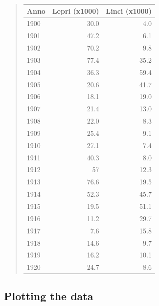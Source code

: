 \documentclass[%
oneside,                 %
final,                   %
10pt]{article}
\begin{document}
\begin{quote}
\begin{tabular}{lrr}
\hline
\multicolumn{1}{c}{ Anno } & \multicolumn{1}{c}{ Lepri (x1000) } & \multicolumn{1}{c}{ Linci (x1000) } \\
\hline
1900 & 30.0          & 4.0           \\
1901 & 47.2          & 6.1           \\
1902 & 70.2          & 9.8           \\
1903 & 77.4          & 35.2          \\
1904 & 36.3          & 59.4          \\
1905 & 20.6          & 41.7          \\
1906 & 18.1          & 19.0          \\
1907 & 21.4          & 13.0          \\
1908 & 22.0          & 8.3           \\
1909 & 25.4          & 9.1           \\
1910 & 27.1          & 7.4           \\
1911 & 40.3          & 8.0           \\
1912 & 57            & 12.3          \\
1913 & 76.6          & 19.5          \\
1914 & 52.3          & 45.7          \\
1915 & 19.5          & 51.1          \\
1916 & 11.2          & 29.7          \\
1917 & 7.6           & 15.8          \\
1918 & 14.6          & 9.7           \\
1919 & 16.2          & 10.1          \\
1920 & 24.7          & 8.6           \\
\hline
\end{tabular}
\end{quote}

\noindent





\subsection*{Plotting the data}


\end{document}

